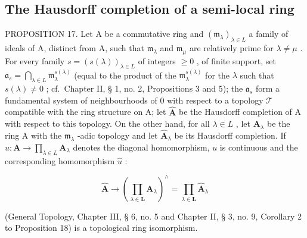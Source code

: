 \subsection{The Hausdorff completion of a semi-local ring}

PROPOSITION 17. Let A be a commutative ring and \((\mathfrak{m}_{\lambda})_{\lambda \in L}\) a family of ideals of A, distinct from A, such that \(\mathfrak{m}_{\lambda}\) and \(\mathfrak{m}_{\mu}\) are relatively prime for \(\lambda \neq \mu\) . For every family \(s = (s(\lambda))_{\lambda \in L}\) of integers \(\geqslant 0\) , of finite support, set \(\mathfrak{a}_{s} = \bigcap_{\lambda \in L} \mathfrak{m}_{\lambda}^{s(\lambda)}\) (equal to the product of the \(\mathfrak{m}_{\lambda}^{s(\lambda)}\) for the \(\lambda\) such that \(s(\lambda) \neq 0\) ; cf.~Chapter II, § 1, no. 2, Propositions 3 and 5); the \(\mathfrak{a}_{s}\) form a fundamental system of neighbourhoods of 0 with respect to a topology \(\mathcal{T}\) compatible with the ring structure on A; let \(\hat{\mathbf{A}}\) be the Hausdorff completion of A with respect to this topology. On the other hand, for all \(\lambda \in L\) , let \(\mathbf{A}_{\lambda}\) be the ring A with the \(\mathfrak{m}_{\lambda}\) -adic topology and let \(\hat{\mathbf{A}}_{\lambda}\) be its Hausdorff completion. If \(u: \mathbf{A} \to \prod_{\lambda \in L} \mathbf{A}_{\lambda}\) denotes the diagonal homomorphism, \(u\) is continuous and the corresponding homomorphism \(\hat{u}\) :

\[
\hat {\mathbf {A}} \rightarrow \left(\prod_ {\lambda \in \mathbf {L}} \mathbf {A} _ {\lambda}\right) ^ {\wedge} = \prod_ {\lambda \in \mathbf {L}} \hat {\mathbf {A}} _ {\lambda}
\]

(General Topology, Chapter III, § 6, no. 5 and Chapter II, § 3, no. 9, Corollary 2 to Proposition 18) is a topological ring isomorphism.

